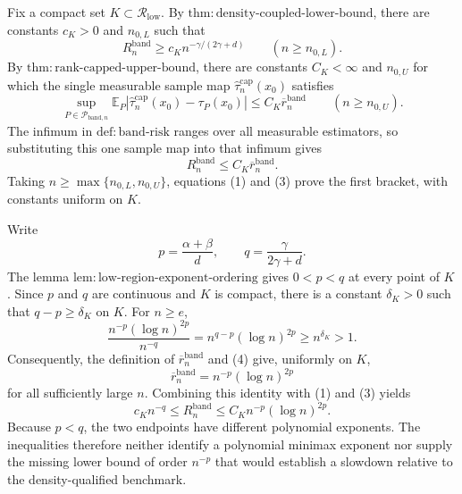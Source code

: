 Fix a compact set \(K\subset\mathcal R_{\mathrm{low}}\).  By
\(\mathrm{thm:density\mbox{-}coupled\mbox{-}lower\mbox{-}bound}\), there
are constants \(c_K>0\) and \(n_{0,L}\) such that
\[
R_n^{\mathrm{band}}\geq c_K n^{-\gamma/(2\gamma+d)}
\qquad(n\geq n_{0,L}).
\tag{1}
\]
By \(\mathrm{thm:rank\mbox{-}capped\mbox{-}upper\mbox{-}bound}\), there
are constants \(C_K<\infty\) and \(n_{0,U}\) for which the single
measurable sample map \(\widehat\tau_n^{\mathrm{cap}}(x_0)\) satisfies
\[
\sup_{P\in\mathcal P_{\mathrm{band},n}}
\mathbb E_P\left|
\widehat\tau_n^{\mathrm{cap}}(x_0)-\tau_P(x_0)
\right|
\leq C_K\overline r_n^{\mathrm{band}}
\qquad(n\geq n_{0,U}).
\tag{2}
\]
The infimum in \(\mathrm{def:band\mbox{-}risk}\) ranges over all measurable
estimators, so substituting this one sample map into that infimum gives
\[
R_n^{\mathrm{band}}\leq C_K\overline r_n^{\mathrm{band}}.
\tag{3}
\]
Taking \(n\geq\max\{n_{0,L},n_{0,U}\}\), equations (1) and (3) prove the
first bracket, with constants uniform on \(K\).

Write
\[
p=\frac{\alpha+\beta}{d},
\qquad
q=\frac{\gamma}{2\gamma+d}.
\]
The lemma
\(\mathrm{lem:low\mbox{-}region\mbox{-}exponent\mbox{-}ordering}\) gives
\(0<p<q\) at every point of \(K\).  Since \(p\) and \(q\) are continuous
and \(K\) is compact, there is a constant \(\delta_K>0\) such that
\(q-p\geq\delta_K\) on \(K\).  For \(n\geq e\),
\[
\frac{n^{-p}(\log n)^{2p}}{n^{-q}}
=n^{q-p}(\log n)^{2p}
\geq n^{\delta_K}>1.
\tag{4}
\]
Consequently, the definition of \(\overline r_n^{\mathrm{band}}\) and (4)
give, uniformly on \(K\),
\[
\overline r_n^{\mathrm{band}}
=n^{-p}(\log n)^{2p}
\]
for all sufficiently large \(n\).  Combining this identity with (1) and
(3) yields
\[
c_Kn^{-q}\leq R_n^{\mathrm{band}}
\leq C_Kn^{-p}(\log n)^{2p}.
\]
Because \(p<q\), the two endpoints have different polynomial exponents.
The inequalities therefore neither identify a polynomial minimax exponent
nor supply the missing lower bound of order \(n^{-p}\) that would establish
a slowdown relative to the density-qualified benchmark.